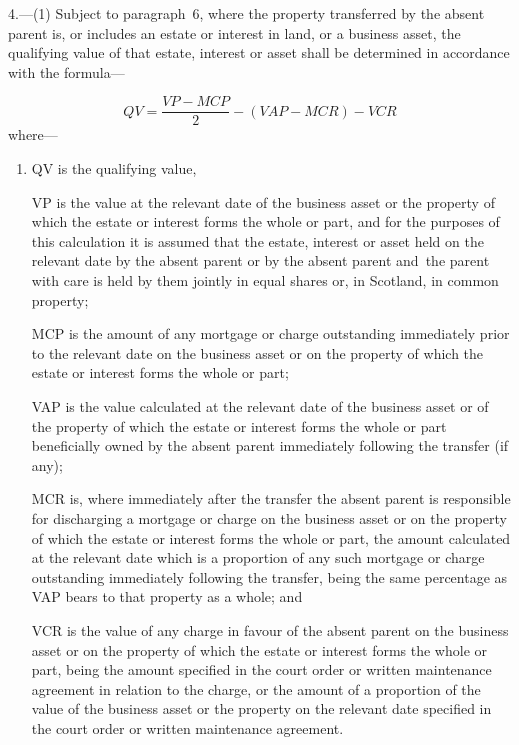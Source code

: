\documentclass[12pt,a4paper]{article}
\begin{document}
4.—(1) Subject to paragraph~6, where the property 
transferred  %
by the absent parent is, or includes an estate or interest in land, or a business asset, the qualifying value of that estate, interest or asset shall be determined in accordance with the formula—
%
%

\[QV = \frac{VP-MCP}{2} - (VAP-MCR) - VCR\]
where—
\begin{enumerate}\item[]
QV is the qualifying value,

VP is the value at the relevant date of the business asset or the property of which the estate or interest forms the whole or part,
and
for the purposes of this calculation it is assumed that the estate, interest or asset held on the relevant date by the absent parent or by the absent parent and~the parent with care is held by them jointly in equal shares or, in Scotland, in common property;

MCP is the amount of any mortgage or charge outstanding immediately prior to the relevant date on the business asset or on the property of which the estate or interest forms the whole or part;

VAP is the value calculated at the relevant date of the business asset or of the property of which the estate or interest forms the whole or part beneficially owned by the absent parent immediately following the transfer (if any);

MCR is, where immediately after the transfer the absent parent is responsible for discharging a mortgage or charge on the business asset or on the property of which the estate or interest forms the whole or part, the amount calculated at the relevant date which is a proportion of any such mortgage or charge outstanding immediately following the transfer, being the same percentage as VAP bears to that property as a whole; and

VCR is the value of any charge in favour of the absent parent on the business asset or on the property of which the estate or interest forms the whole or part, being the amount specified in the court order or written maintenance agreement in relation to the charge, or the amount of a proportion of the value of the business asset or the property on the relevant date specified in the court order or written maintenance agreement.
\end{enumerate}
\end{document}
